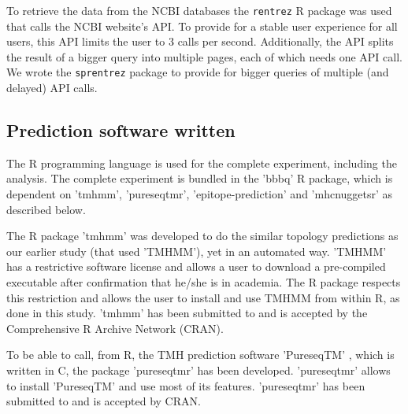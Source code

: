 To retrieve the data from the NCBI databases the
\verb;rentrez; R package \cite{rentrez} was used
that calls the NCBI website's API. To provide for a 
stable user experience for all users, 
this API limits the user to 3 calls per second.
Additionally, the API splits the result of a bigger
query into multiple pages, each of which needs one API call.
We wrote the \verb;sprentrez; package \cite{sprentrez} to provide for 
bigger queries of multiple (and delayed) API calls.

\clearpage

\subsection{Prediction software written}

The R programming language is used for the complete 
experiment, including the analysis.
The complete experiment is bundled in the 'bbbq' R package,
which is dependent on 'tmhmm', 'pureseqtmr', 
'epitope-prediction' and 'mhcnuggetsr'
as described below.


The R package 'tmhmm' was developed to do the similar topology
predictions as our earlier study (that used 'TMHMM'), yet in an automated way.
'TMHMM' has a restrictive software license \cite{krogh2001predicting} 
and allows a user
to download a pre-compiled executable after confirmation that he/she
is in academia. The R package respects this restriction
and allows the user to install and use TMHMM from within R,
as done in this study.
'tmhmm' has been submitted to and is accepted 
by the Comprehensive R Archive Network (CRAN).


To be able to call, from R, the TMH prediction 
software 'PureseqTM' \cite{wang2019efficient},
which is written in C, the package 'pureseqtmr' has been developed. 
'pureseqtmr' allows to install 'PureseqTM' and use most of its features.
'pureseqtmr' has been submitted to and is accepted by CRAN.


